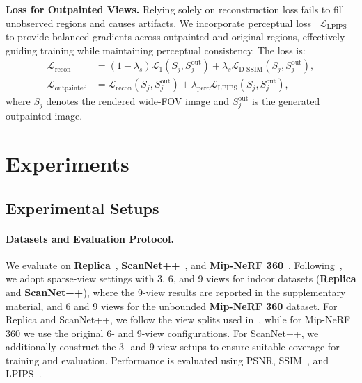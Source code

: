 \documentclass[runningheads]{llncs}
\begin{document}
\noindent\textbf{Loss for Outpainted Views.}
Relying solely on reconstruction loss fails to fill unobserved regions and causes artifacts. We incorporate perceptual loss~\cite{johnson2016perceptual} $\mathcal{L}_{\text{LPIPS}}$ to provide balanced gradients across outpainted and original regions, effectively guiding training while maintaining perceptual consistency. The loss is:
\begin{equation}
\begin{aligned}
\mathcal{L}_{\text{recon}} &= (1-\lambda_s)\mathcal{L}_1(S_j, S^{\text{out}}_j) 
+ \lambda_s\mathcal{L}_{\text{D-SSIM}}(S_j, S^{\text{out}}_j), \\
\mathcal{L}_{\text{outpainted}} &= \mathcal{L}_{\text{recon}}(S_j, S^{\text{out}}_j) 
+ \lambda_{\text{perc}}\mathcal{L}_{\text{LPIPS}}(S_j, S^{\text{out}}_j),
\end{aligned}
\label{eq:loss_outpaint}
\end{equation}
where $S_j$ denotes the rendered wide-FOV image and $S^{\text{out}}_j$ is the generated outpainted image.



\section{Experiments}


\subsection{Experimental Setups}

\paragraph{Datasets and Evaluation Protocol.}
We evaluate on \textbf{Replica}~\cite{straub2019replica}, \textbf{ScanNet++}~\cite{yeshwanth2023scannet++}, and \textbf{Mip-NeRF 360}~\cite{barron2023mipnerf360}. 
Following~\cite{zhong2025taming,zhong2025empowering}, we adopt sparse-view settings with 3, 6, and 9 views for indoor datasets (\textbf{Replica} and \textbf{ScanNet++}), where the 9-view results are reported in the supplementary material, and 6 and 9 views for the unbounded \textbf{Mip-NeRF 360} dataset. 
For Replica and ScanNet++, we follow the view splits used in~\cite{zhong2025taming,zhong2025empowering}, while for Mip-NeRF 360 we use the original 6- and 9-view configurations. 
For ScanNet++, we additionally construct the 3- and 9-view setups to ensure suitable coverage for training and evaluation. 
Performance is evaluated using PSNR, SSIM~\cite{wang2004image}, and LPIPS~\cite{zhang2018unreasonable}.
\end{document}
